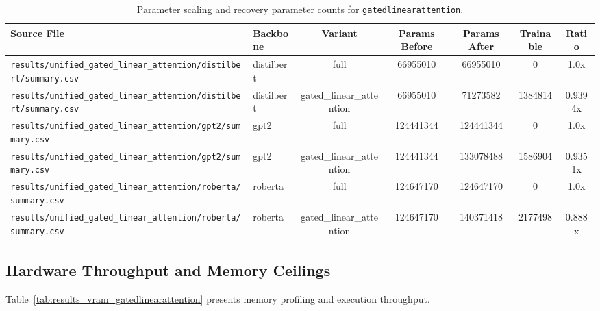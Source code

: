 \begin{table}[t]
\centering
\small
\begin{tabular}{llccccc}
\toprule
\textbf{Source File} & \textbf{Backbone} & \textbf{Variant} & \textbf{Params Before} & \textbf{Params After} & \textbf{Trainable} & \textbf{Ratio} \\
\midrule
\texttt{results/unified\_gated\_linear\_attention/distilbert/summary.csv} & distilbert & full & 66955010 & 66955010 & 0 & 1.0x \\
\texttt{results/unified\_gated\_linear\_attention/distilbert/summary.csv} & distilbert & gated\_linear\_attention & 66955010 & 71273582 & 1384814 & 0.9394x \\
\texttt{results/unified\_gated\_linear\_attention/gpt2/summary.csv} & gpt2 & full & 124441344 & 124441344 & 0 & 1.0x \\
\texttt{results/unified\_gated\_linear\_attention/gpt2/summary.csv} & gpt2 & gated\_linear\_attention & 124441344 & 133078488 & 1586904 & 0.9351x \\
\texttt{results/unified\_gated\_linear\_attention/roberta/summary.csv} & roberta & full & 124647170 & 124647170 & 0 & 1.0x \\
\texttt{results/unified\_gated\_linear\_attention/roberta/summary.csv} & roberta & gated\_linear\_attention & 124647170 & 140371418 & 2177498 & 0.888x \\
\bottomrule
\end{tabular}
\caption{Parameter scaling and recovery parameter counts for \texttt{gatedlinearattention}.}
\label{tab:results_params_gatedlinearattention}
\end{table}

\subsection{Hardware Throughput and Memory Ceilings}
Table~\ref{tab:results_vram_gatedlinearattention} presents memory profiling and execution throughput.

